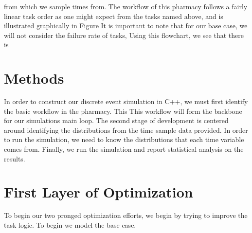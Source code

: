 \documentclass[10pt]{report}            %
\begin{document}
from which we sample times from.
The workflow of this pharmacy follows a fairly linear task order as one might expect from the tasks named above, and is illustrated graphically in Figure 
It is important to note that for our base case, we will not consider the failure rate of tasks,
Using this flowchart, we see that there is
\section*{Methods}
In order to construct our discrete event simulation in C++, we must first identify the basic workflow in the pharmacy. This  This workflow will form the backbone for our simulations main loop. The second stage of development is centered around identifying the distributions from the time sample data provided. In order to run the simulation, we need to know the distributions that each time variable comes from. Finally, we run the simulation and report statistical analysis on the results.


\section*{First Layer of Optimization}
To begin our two pronged optimization efforts, we begin by trying to improve the task logic. To begin we model the base case.
\end{document}
